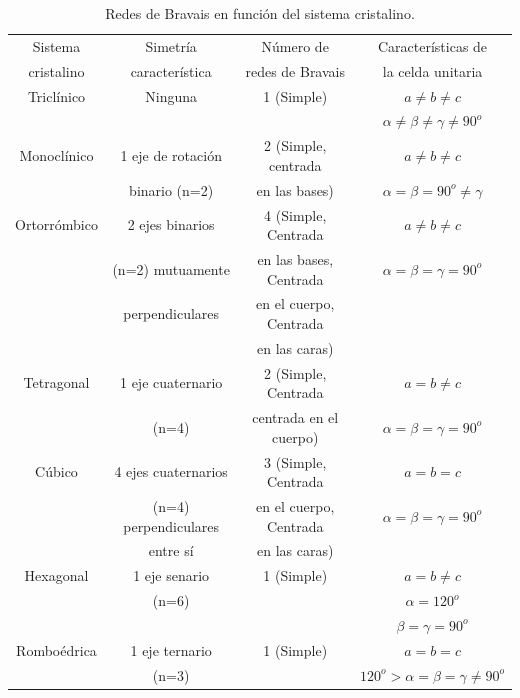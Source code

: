 \begin{table}[h!] \centering
    \begin{tabular}{cccc}
        Sistema  & Simetría  & Número de & Características de \\ 
        cristalino & característica & redes de Bravais & la celda unitaria \\
        \hline \hline 
        Triclínico & Ninguna & 1 (Simple) & $a \neq b \neq c$ \\
        & & & $\alpha \neq \beta \neq \gamma \neq 90^o$ \\ \hline
        Monoclínico & 1 eje de rotación & 2 (Simple, centrada & $a \neq b \neq c$ \\
        & binario (n=2) & en las bases) & $\alpha = \beta = 90^o \neq \gamma$ \\ \hline Ortorrómbico & 2 ejes binarios & 4 (Simple, Centrada & $a \neq b \neq c$ \\
        & (n=2) mutuamente & en las bases, Centrada & $ \alpha = \beta = \gamma = 90^o$ \\
        & perpendiculares & en el cuerpo, Centrada & \\
        & & en las caras) & \\ \hline
        Tetragonal  & 1 eje cuaternario & 2 (Simple, Centrada & $a=b\neq c$ \\
        & (n=4) & centrada en el cuerpo) & $ \alpha = \beta = \gamma = 90^o$ \\ \hline
        Cúbico & 4 ejes cuaternarios & 3 (Simple, Centrada & $a=b=c$ \\
        & (n=4) perpendiculares & en el cuerpo, Centrada & $ \alpha = \beta = \gamma = 90^o$ \\ 
        & entre sí & en las caras)  & \\ \hline 
        Hexagonal & 1 eje senario & 1 (Simple) & $a=b\neq c$ \\
        & (n=6) & & $\alpha=120^o$  \\
        & & & $\beta = \gamma = 90^o$ \\ \hline
        Romboédrica& 1 eje ternario & 1 (Simple) & $a=b=c$ \\ 
        & (n=3) & & $120^o > \alpha = \beta = \gamma \neq 90^o$\\ \hline
    \end{tabular}
    \caption{Redes de Bravais en función del sistema cristalino.}
    \label{Tab:01-01}
\end{table}


